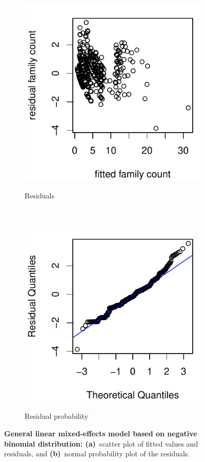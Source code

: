 \documentclass[10pt,letterpaper,twocolumn]{article}
\begin{document}
\begin{figure}[h]
	\centering
	\begin{subfigure}[b]{0.23\textwidth}
		\caption{Residuals}
		\includegraphics[width=\textwidth]{plots/glmm/2015_glmm_residual.pdf}
		\label{fig:glmm_resid}
	\end{subfigure}
	~
	\begin{subfigure}[b]{0.23\textwidth}
		\caption{Residual probability}
		\includegraphics[width=\textwidth]{plots/glmm/2015_glmm_qqplot.pdf}
		\label{fig:glmm_qqplot}
	\end{subfigure}
	\caption{\textbf{General linear mixed-effects model based on negative binomial distribution: (a)}~scatter plot of fitted values and residuals, and \textbf{(b)}~normal probability plot of the residuals.}
	\label{fig:glmm}
	\nointerlineskip
	\hrulefill
\end{figure}
\end{document}
